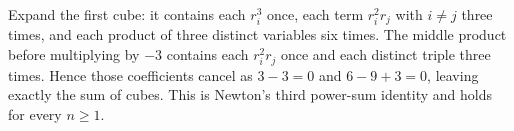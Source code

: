 Expand the first cube: it contains each $r_i^3$ once, each term $r_i^2r_j$ with $i\ne j$ three times, and each product of three distinct variables six times. The middle product before multiplying by $-3$ contains each $r_i^2r_j$ once and each distinct triple three times. Hence those coefficients cancel as $3-3=0$ and $6-9+3=0$, leaving exactly the sum of cubes. This is Newton's third power-sum identity and holds for every $n\ge1$.
